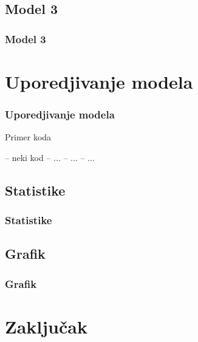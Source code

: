 \documentclass{beamer}
\begin{document}

\subsection{Model 3}
\begin{frame}
\frametitle{Model 3}

\end{frame}



\section{Uporedjivanje modela}
\begin{frame}
\frametitle{Uporedjivanje modela}


\begin{block}{Primer koda}

\begin{semiverbatim}
-- neki kod
-- ...
-- ...
-- ...
\end{semiverbatim}
\end{block}

\end{frame}


\subsection{Statistike}
\begin{frame}
\frametitle{Statistike}


\end{frame}


\subsection{Grafik}
\begin{frame}
\frametitle{Grafik}

\end{frame}


\section{Zaključak}
\end{document}
